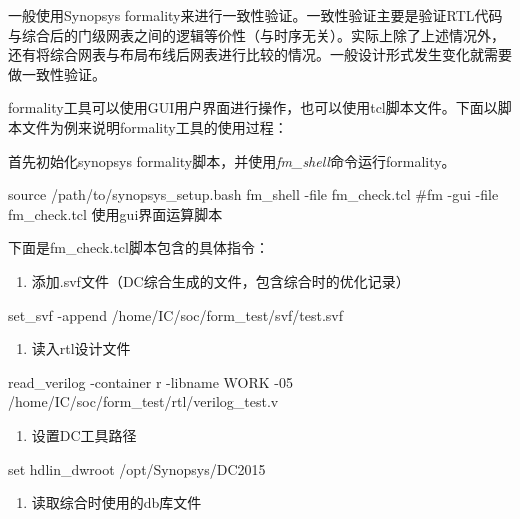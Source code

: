 一般使用Synopsys formality来进行一致性验证。一致性验证主要是验证RTL代码与综合后的门级网表之间的逻辑等价性（与时序无关）。实际上除了上述情况外，还有将综合网表与布局布线后网表进行比较的情况。一般设计形式发生变化就需要做一致性验证。

formality工具可以使用GUI用户界面进行操作，也可以使用tcl脚本文件。下面以脚本文件为例来说明formality工具的使用过程：

首先初始化synopsys formality脚本，并使用\emph{fm\_shell}命令运行formality。

\begin{CodeBlock}[language=BookShell]
source /path/to/synopsys_setup.bash
fm_shell -file fm_check.tcl
#fm -gui -file fm_check.tcl 使用gui界面运算脚本
\end{CodeBlock}

下面是fm\_check.tcl脚本包含的具体指令：

\begin{enumerate}
\def\labelenumi{\arabic{enumi}.}
\tightlist
\item
  添加.svf文件（DC综合生成的文件，包含综合时的优化记录）
\end{enumerate}

\begin{CodeBlock}[language=BookTcl]
set_svf -append {/home/IC/soc/form_test/svf/test.svf}
\end{CodeBlock}

\begin{enumerate}
\def\labelenumi{\arabic{enumi}.}
\setcounter{enumi}{1}
\tightlist
\item
  读入rtl设计文件
\end{enumerate}

\begin{CodeBlock}[language=BookTcl]
read_verilog -container r -libname WORK -05 { /home/IC/soc/form_test/rtl/verilog_test.v }
\end{CodeBlock}

\begin{enumerate}
\def\labelenumi{\arabic{enumi}.}
\setcounter{enumi}{2}
\tightlist
\item
  设置DC工具路径
\end{enumerate}

\begin{CodeBlock}[language=BookTcl]
set hdlin_dwroot /opt/Synopsys/DC2015
\end{CodeBlock}

\begin{enumerate}
\def\labelenumi{\arabic{enumi}.}
\setcounter{enumi}{3}
\tightlist
\item
  读取综合时使用的db库文件
\end{enumerate}

